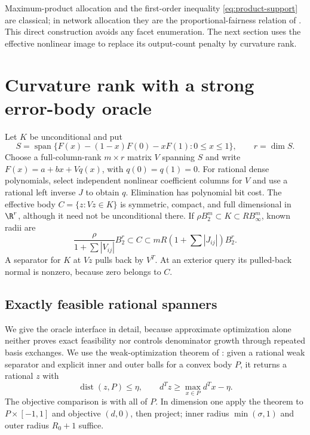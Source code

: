 Maximum-product allocation and the first-order inequality
\eqref{eq:product-support} are classical; in network allocation they
are the proportional-fairness relation of \citet[Section 2]{kelly1998}.
This direct construction avoids any facet enumeration. The next section
uses the effective nonlinear image to replace its output-count penalty
by curvature rank.

\section{Curvature rank with a strong error-body oracle}\label{sec:vector-oracle}

Let $K$ be unconditional and put
\begin{equation}\label{eq:nonlinear-output-image}
 S=\operatorname{span}\{F(x)-(1-x)F(0)-xF(1):0\le x\le1\},
 \qquad r=\dim S.
\end{equation}
Choose a full-column-rank $m\times r$ matrix $V$ spanning $S$ and write
$F(x)=a+bx+Vq(x)$, with $q(0)=q(1)=0$.
For rational dense polynomials, select independent nonlinear coefficient
columns for $V$ and use a rational left inverse $J$ to obtain $q$.
Elimination has polynomial bit cost. The effective body
$C=\{z:Vz\in K\}$ is symmetric, compact, and full dimensional in
$\R^r$, although it need not be unconditional there.
If $\rho B_2^m\subset K\subset R B_\infty^m$, known radii are
\begin{equation}\label{eq:effective-body-radii}
 \frac{\rho}{1+\sum|V_{ij}|}B_2^r\subset C
 \subset mR(1+\sum|J_{ij}|)B_2^r.
\end{equation}
A separator for $K$ at $Vz$ pulls back by $V^T$. At an exterior query
its pulled-back normal is nonzero, because zero belongs to $C$.

\subsection{Exactly feasible rational spanners}

We give the oracle interface in detail, because approximate optimization
alone neither proves exact feasibility nor controls denominator growth
through repeated basis exchanges. We use the weak-optimization theorem
of \citet[Definition (5), Theorem (3.1)]{gls1981}: given a rational weak
separator and explicit inner and outer balls for a convex body $P$, it
returns a rational $z$ with
\begin{equation}\label{eq:weak-opt-spanner}
 \operatorname{dist}(z,P)\le\eta,
 \qquad d^Tz\ge\max_{x\in P}d^Tx-\eta.
\end{equation}
The objective comparison is with all of $P$. In dimension one apply the
theorem to $P\times[-1,1]$ and objective $(d,0)$, then project; inner
radius $\min(\sigma,1)$ and outer radius $R_0+1$ suffice.

